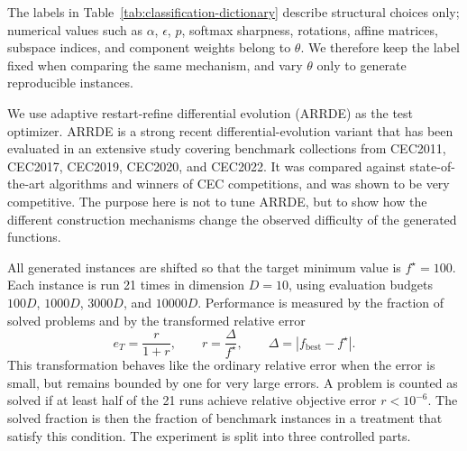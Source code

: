 \documentclass[journal]{IEEEtran}
\theoremstyle{remark}
\theoremstyle{plain}
\begin{document}
The labels in Table~\ref{tab:classification-dictionary} describe structural
choices only; numerical values such as \(\alpha\), \(\epsilon\), \(p\), softmax
sharpness, rotations, affine matrices, subspace indices, and component weights
belong to \(\theta\). We therefore keep the label fixed when comparing the same
mechanism, and vary \(\theta\) only to generate reproducible instances. 

We use adaptive restart-refine differential evolution
(ARRDE)\cite{muzakka2026robustdifferentialevolutionnonlinear} as the test
optimizer. ARRDE is a strong recent differential-evolution variant that has
been evaluated in an extensive study covering benchmark collections from
CEC2011, CEC2017, CEC2019, CEC2020, and CEC2022. It was compared against
state-of-the-art algorithms and winners of CEC competitions, and was shown to
be very competitive. The purpose here is not to tune ARRDE, but to show how the
different construction mechanisms change the observed difficulty of the
generated functions.

All generated instances are shifted so that the target minimum value is
\(f^\star=100\). Each instance is run 21 times in dimension \(D=10\), using
evaluation budgets \(100D\), \(1000D\), \(3000D\), and \(10000D\). Performance
is measured by the fraction of solved problems and by the transformed relative error
\[
	e_T=\frac{r}{1+r},
	\qquad
	r=\frac{\Delta}{f^\star},
	\qquad
	\Delta=|f_{\mathrm{best}}-f^\star|.
\]
This transformation behaves like the ordinary relative error when the error is
small, but remains bounded by one for very large errors. A problem is counted
as solved if at least half of the 21 runs achieve relative objective error
\(r<10^{-6}\). The solved fraction is then the fraction of benchmark instances
in a treatment that satisfy this condition. The experiment is split into three
controlled parts.
\end{document}
